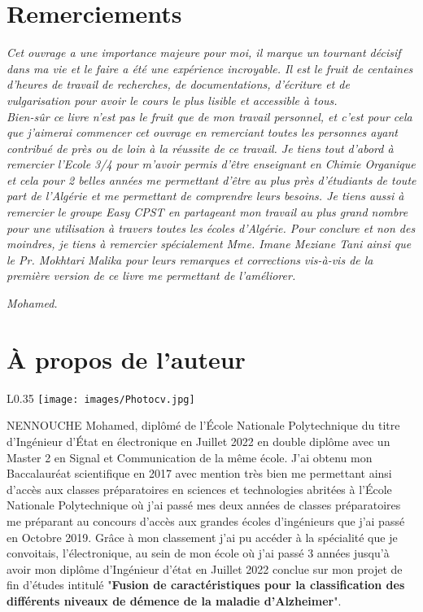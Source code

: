 \documentclass[a4paper, oneside]{book}
\begin{document}
\section*{Remerciements}
\begin{Large}
\textit{Cet ouvrage a une importance majeure pour moi, il marque un tournant décisif dans ma vie et le faire a été une expérience incroyable. Il est le fruit de centaines d'heures de travail de recherches, de documentations, d'écriture et de vulgarisation pour avoir le cours le plus lisible et accessible à tous.}\\[0.2mm]

\textit{Bien-sûr ce livre n'est pas le fruit que de mon travail personnel, et c'est pour cela que j'aimerai commencer cet ouvrage en remerciant toutes les personnes ayant contribué de près ou de loin à la réussite de ce travail. Je tiens tout d'abord à remercier l'Ecole 3/4 pour m'avoir permis d'être enseignant en Chimie Organique et cela pour 2 belles années me permettant d'être au plus près d'étudiants de toute part de l'Algérie et me permettant de comprendre leurs besoins. Je tiens aussi à remercier le groupe Easy CPST en partageant mon travail au plus grand nombre pour une utilisation à travers toutes les écoles d'Algérie. Pour conclure et non des moindres, je tiens à remercier spécialement Mme. Imane Meziane Tani ainsi que le Pr. Mokhtari Malika pour leurs remarques et corrections vis-à-vis de la première version de ce livre me permettant de l'améliorer.}
\begin{flushright}
   \textit{ Mohamed.}
\end{flushright}
\end{Large}
\vspace*{\fill}
\newpage
\vspace*{0.2\textheight}
\section*{À propos de l'auteur}
\begin{wrapfigure}[9]{L}{0.35\textwidth}
    \vspace*{-1cm}
    \centering
    \texttt{[image: images/Photocv.jpg]}
\end{wrapfigure}
NENNOUCHE Mohamed, diplômé de l'\'Ecole Nationale Polytechnique du titre d'Ingénieur d'\'Etat en électronique en Juillet 2022 en double diplôme avec un Master 2 en Signal et Communication de la même école. J'ai obtenu mon Baccalauréat scientifique en 2017 avec mention très bien me permettant ainsi d'accès aux classes préparatoires en sciences et technologies abritées à l'\'Ecole Nationale Polytechnique où j'ai passé mes deux années de classes préparatoires me préparant au concours d'accès aux grandes écoles d'ingénieurs que j'ai passé en Octobre 2019. Grâce à mon classement j'ai pu accéder à la spécialité que je convoitais, l'électronique, au sein de mon école où j'ai passé 3 années jusqu'à avoir mon diplôme d'Ingénieur d'état en Juillet 2022 conclue sur mon projet de fin d'études intitulé "\textbf{Fusion de caractéristiques pour la classification des différents niveaux de démence de la maladie d’Alzheimer}".
\end{document}
